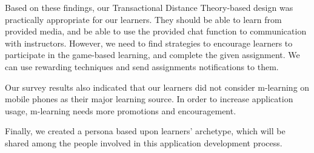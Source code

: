 \documentclass[a4paper,twoside]{article}
\begin{document}
Based on these findings, our Transactional Distance Theory-based design was practically appropriate for our learners. They should be able to learn from provided media, and be able to use the provided chat function to communication with instructors. However, we need to find strategies to encourage learners to participate in the game-based learning, and complete the given assignment. We can use rewarding techniques and send assignments notifications to them. 

Our survey results also indicated that our learners did not consider m-learning on mobile phones as their major learning source. In order to increase application usage, m-learning needs more promotions and encouragement. 

Finally, we created a persona based upon learners' archetype, which will be shared among the people involved in this application development process. 


\vfill

{\small
}

\vfill
\end{document}

